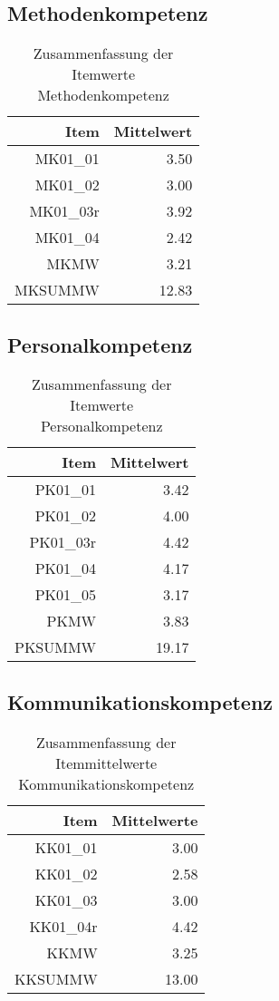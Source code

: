 \documentclass[12pt, bibliography=totoc]{scrartcl}
\begin{document}
\subsection{Methodenkompetenz}\label{methodenkompetenz}

\begin{table}[ht]
\centering
\caption{Zusammenfassung der Itemwerte Methodenkompetenz}
\begin{tabular}{rr}
  \hline
 Item & Mittelwert \\
  \hline
MK01\_01 & 3.50 \\
  MK01\_02 & 3.00 \\
  MK01\_03r & 3.92 \\
  MK01\_04 & 2.42 \\
  MKMW & 3.21 \\
  MKSUMMW & 12.83 \\
   \hline
\end{tabular}
\end{table}

\subsection{Personalkompetenz}\label{personalkompetenz}

\begin{table}[ht]
\centering
\caption{Zusammenfassung der Itemwerte Personalkompetenz}
\begin{tabular}{rr}
  \hline
 Item & Mittelwert\\
  \hline
PK01\_01 & 3.42 \\
  PK01\_02 & 4.00 \\
  PK01\_03r & 4.42 \\
  PK01\_04 & 4.17 \\
  PK01\_05 & 3.17 \\
  PKMW & 3.83 \\
  PKSUMMW & 19.17 \\
   \hline
\end{tabular}
\end{table}

\subsection{Kommunikationskompetenz}\label{kommunikationskompetenz}

\begin{table}[ht]
\centering
\caption{Zusammenfassung der Itemmittelwerte Kommunikationskompetenz}
\begin{tabular}{rr}
  \hline
 Item & Mittelwerte \\
  \hline
KK01\_01 & 3.00 \\
  KK01\_02 & 2.58 \\
  KK01\_03 & 3.00 \\
  KK01\_04r & 4.42 \\
  KKMW & 3.25 \\
  KKSUMMW & 13.00 \\
   \hline
\end{tabular}
\end{table}
\end{document}
